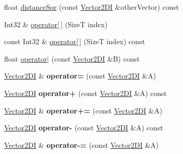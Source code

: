 \begin{DoxyCompactItemize}
\item 
float \hyperlink{classdrider_s_d_k_1_1_vector2_d_i_adaee7a32b75dfde110e6a825c4fbc656}{distance\+Sqr} (const \hyperlink{classdrider_s_d_k_1_1_vector2_d_i}{Vector2\+DI} \&other\+Vector) const
\item 
Int32 \& \hyperlink{classdrider_s_d_k_1_1_vector2_d_i_a0a9232594d7e6bb774ce85adad91129b}{operator\mbox{[}$\,$\mbox{]}} (SizeT index)
\item 
const Int32 \& \hyperlink{classdrider_s_d_k_1_1_vector2_d_i_ad842c5082bbdfbc017fcfac8240197bb}{operator\mbox{[}$\,$\mbox{]}} (SizeT index) const
\item 
float \hyperlink{classdrider_s_d_k_1_1_vector2_d_i_a9a101d51a408b48cbc846073b54bf30e}{operator$\vert$} (const \hyperlink{classdrider_s_d_k_1_1_vector2_d_i}{Vector2\+DI} \&B) const
\item 
\mbox{\label{classdrider_s_d_k_1_1_vector2_d_i_aeca5f2fe0ee64fadce1fbeceec369dbf}} 
\hyperlink{classdrider_s_d_k_1_1_vector2_d_i}{Vector2\+DI} \& {\bfseries operator=} (const \hyperlink{classdrider_s_d_k_1_1_vector2_d_i}{Vector2\+DI} \&A)
\item 
\mbox{\label{classdrider_s_d_k_1_1_vector2_d_i_ab90cb26711a517ec47ba54980c3ee526}} 
\hyperlink{classdrider_s_d_k_1_1_vector2_d_i}{Vector2\+DI} {\bfseries operator+} (const \hyperlink{classdrider_s_d_k_1_1_vector2_d_i}{Vector2\+DI} \&A) const
\item 
\mbox{\label{classdrider_s_d_k_1_1_vector2_d_i_af2c63b463e4a5e347aee4af55f8d894d}} 
\hyperlink{classdrider_s_d_k_1_1_vector2_d_i}{Vector2\+DI} \& {\bfseries operator+=} (const \hyperlink{classdrider_s_d_k_1_1_vector2_d_i}{Vector2\+DI} \&A)
\item 
\mbox{\label{classdrider_s_d_k_1_1_vector2_d_i_a5b131ff8b63123a93339bbef39f33b88}} 
\hyperlink{classdrider_s_d_k_1_1_vector2_d_i}{Vector2\+DI} {\bfseries operator-\/} (const \hyperlink{classdrider_s_d_k_1_1_vector2_d_i}{Vector2\+DI} \&A) const
\item 
\mbox{\label{classdrider_s_d_k_1_1_vector2_d_i_ad05897b324c078987e521b5c2f3edee8}} 
\hyperlink{classdrider_s_d_k_1_1_vector2_d_i}{Vector2\+DI} \& {\bfseries operator-\/=} (const \hyperlink{classdrider_s_d_k_1_1_vector2_d_i}{Vector2\+DI} \&A)

\end{DoxyCompactItemize}
